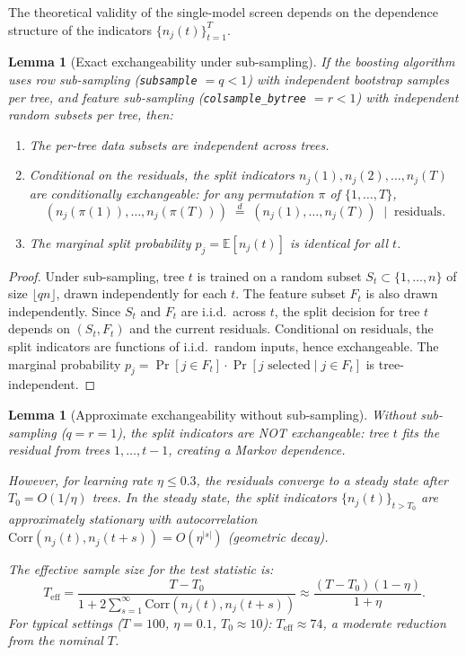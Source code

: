 \documentclass{article}
\newtheorem{lemma}[theorem]{Lemma}
\begin{document}
The theoretical validity of the single-model screen depends on the
dependence structure of the indicators $\{n_j(t)\}_{t=1}^T$.

\begin{lemma}[Exact exchangeability under sub-sampling]
\label{lem:exchange-subsample}
If the boosting algorithm uses row sub-sampling (\texttt{subsample}
$= q < 1$) with independent bootstrap samples per tree, and feature
sub-sampling (\texttt{colsample\_bytree} $= r < 1$) with independent
random subsets per tree, then:
\begin{enumerate}
    \item The per-tree data subsets are independent across trees.
    \item Conditional on the residuals, the split indicators
      $n_j(1), n_j(2), \ldots, n_j(T)$ are \emph{conditionally
      exchangeable}: for any permutation $\pi$ of $\{1, \ldots, T\}$,
      \[
          (n_j(\pi(1)), \ldots, n_j(\pi(T))) \;\overset{d}{=}\;
          (n_j(1), \ldots, n_j(T)) \;\mid\; \text{residuals}.
      \]
    \item The marginal split probability $p_j = \mathbb{E}[n_j(t)]$
      is identical for all $t$.
\end{enumerate}
\end{lemma}

\begin{proof}
Under sub-sampling, tree $t$ is trained on a random subset
$S_t \subset \{1, \ldots, n\}$ of size $\lfloor qn \rfloor$,
drawn independently for each $t$. The feature subset $F_t$ is also
drawn independently. Since $S_t$ and $F_t$ are i.i.d.\ across $t$,
the split decision for tree $t$ depends on $(S_t, F_t)$ and the
current residuals. Conditional on residuals, the split indicators are
functions of i.i.d.\ random inputs, hence exchangeable.
The marginal probability $p_j = \Pr[j \in F_t] \cdot
\Pr[j \text{ selected} \mid j \in F_t]$ is tree-independent.
\end{proof}

\begin{lemma}[Approximate exchangeability without sub-sampling]
\label{lem:exchange-no-subsample}
Without sub-sampling ($q = r = 1$), the split indicators are NOT
exchangeable: tree $t$ fits the residual from trees $1, \ldots, t-1$,
creating a Markov dependence.

However, for learning rate $\eta \leq 0.3$, the residuals converge
to a \emph{steady state} after $T_0 = O(1/\eta)$ trees. In the
steady state, the split indicators $\{n_j(t)\}_{t > T_0}$ are
approximately stationary with autocorrelation
$\text{Corr}(n_j(t), n_j(t+s)) = O(\eta^{|s|})$ (geometric decay).

The effective sample size for the test statistic is:
\[
    T_{\text{eff}} = \frac{T - T_0}{1 + 2\sum_{s=1}^\infty
    \text{Corr}(n_j(t), n_j(t+s))} \approx
    \frac{(T - T_0)(1 - \eta)}{1 + \eta}.
\]
For typical settings ($T = 100$, $\eta = 0.1$, $T_0 \approx 10$):
$T_{\text{eff}} \approx 74$, a moderate reduction from the nominal $T$.
\end{lemma}
\end{document}
